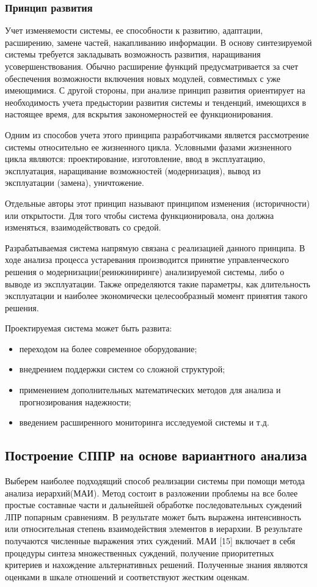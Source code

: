 \subsubsection{Принцип развития}

Учет изменяемости системы, ее способности к развитию, адаптации, расширению, замене частей, накапливанию информации. 
В основу синтезируемой системы требуется закладывать возможность развития, наращивания усовершенствования. 
Обычно расширение функций предусматривается за счет обеспечения возможности включения новых модулей, совместимых с уже имеющимися. 
С другой стороны, при анализе принцип развития ориентирует на необходимость учета предыстории развития системы и тенденций, имеющихся в настоящее время, для вскрытия закономерностей ее функционирования.

Одним из способов учета этого принципа разработчиками является рассмотрение системы относительно ее жизненного цикла. 
Условными фазами жизненного цикла являются: проектирование, изготовление, ввод в эксплуатацию, эксплуатация, наращивание возможностей (модернизация), вывод из эксплуатации (замена), уничтожение.

Отдельные авторы этот принцип называют принципом изменения (историчности) или открытости. 
Для того чтобы система функционировала, она должна изменяться, взаимодействовать со средой.

Разрабатываемая система напрямую связана с реализацией данного принципа. 
В ходе анализа процесса устаревания производится принятие управленческого решения о модернизации(реинжиниринге) анализируемой системы, либо о выводе из эксплуатации. 
Также определяются такие параметры, как длительность эксплуатации и наиболее экономически целесообразный момент принятия такого решения. 

Проектируемая система может быть развита:
\begin{itemize}
    \item переходом на более современное оборудование;
    \item внедрением поддержки систем со сложной структурой;
    \item применением дополнительных математических методов для анализа и прогнозирования надежности;
    \item введением расширенного мониторинга исследуемой системы и т.д.
\end{itemize}

\subsection{Построение СППР на основе вариантного анализа}
Выберем наиболее подходящий способ реализации системы при помощи метода анализа иерархий(МАИ). 
Метод состоит в разложении проблемы на все более простые составные части и дальнейшей обработке последовательных суждений ЛПР попарным сравнениям. 
В результате может быть выражена интенсивность или относительная степень взаимодействия элементов в иерархии. 
В результате получаются численные выражения этих суждений. 
МАИ [15] включает в себя процедуры синтеза множественных суждений, получение приоритетных критериев и нахождение альтернативных решений. 
Полученные знания являются оценками в шкале отношений и соответствуют жестким оценкам. 

